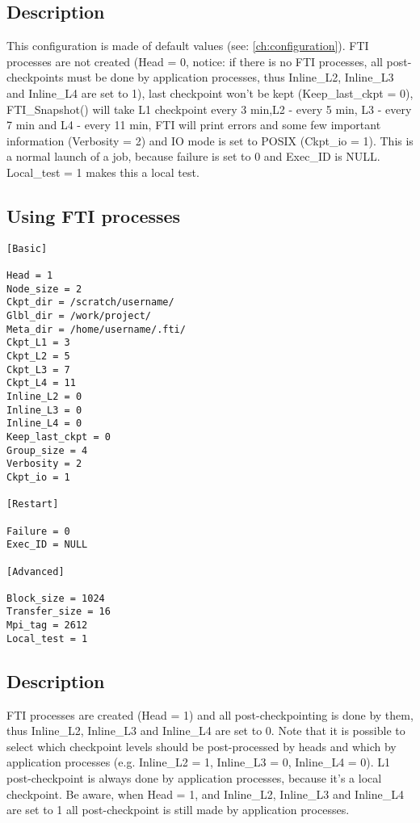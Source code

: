 \documentclass{refrep}
\begin{document}
\subsection*{Description}
This configuration is made of default values (see: \ref{ch:configuration}). FTI processes are not created (Head = 0, notice: if there is no FTI processes, all post-checkpoints must be done by application processes, thus Inline\_L2, Inline\_L3 and Inline\_L4 are set to 1), last checkpoint won't be kept (Keep\_last\_ckpt = 0), FTI\_Snapshot() will take L1 checkpoint every 3 min,L2 - every 5 min, L3 - every 7 min and L4 - every 11 min, FTI will print errors and some few important information (Verbosity = 2) and IO mode is set to POSIX (Ckpt\_io = 1). This is a normal launch of a job, because failure is set to 0 and Exec\_ID is NULL. Local\_test = 1 makes this a local test.
\newpage
\subsection{Using FTI processes}\label{subsec:configftiprocces}
\begin{center}
\begin{lstlisting}[frame=single]
[Basic]

Head = 1
Node_size = 2
Ckpt_dir = /scratch/username/
Glbl_dir = /work/project/
Meta_dir = /home/username/.fti/
Ckpt_L1 = 3
Ckpt_L2 = 5
Ckpt_L3 = 7
Ckpt_L4 = 11
Inline_L2 = 0
Inline_L3 = 0
Inline_L4 = 0
Keep_last_ckpt = 0
Group_size = 4
Verbosity = 2
Ckpt_io = 1

[Restart]

Failure = 0
Exec_ID = NULL

[Advanced]

Block_size = 1024
Transfer_size = 16
Mpi_tag = 2612
Local_test = 1

\end{lstlisting}
\end{center}
\subsection*{Description}
FTI processes are created (Head = 1) and all post-checkpointing is done by them, thus Inline\_L2, Inline\_L3 and Inline\_L4 are set to 0. Note that it is possible to select which checkpoint levels should be post-processed by heads and which by application processes (e.g. Inline\_L2 = 1, Inline\_L3 = 0, Inline\_L4 = 0). L1 post-checkpoint is always done by application processes, because it's a local checkpoint. Be aware, when Head = 1, and Inline\_L2, Inline\_L3 and Inline\_L4 are set to 1 all post-checkpoint is still made by application processes.
\newpage
\end{document}
